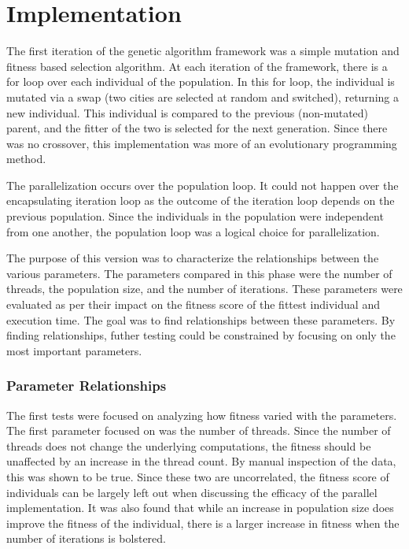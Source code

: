 \documentclass[10pt,letterpaper]{article}
\begin{document}
\section{Implementation} \label{sec:implementation}
The first iteration of the genetic algorithm framework was a simple mutation and fitness based selection algorithm. At each iteration of the framework, there is a for loop over each individual of the population. In this for loop, the individual is mutated via a swap (two cities are selected at random and switched), returning a new individual. This individual is compared to the previous (non-mutated) parent, and the fitter of the two is selected for the next generation. Since there was no crossover, this implementation was more of an evolutionary programming method. 

The parallelization occurs over the population loop. It could not happen over the encapsulating iteration loop as the outcome of the iteration loop depends on the previous population. Since the individuals in the population were independent from one another, the population loop was a logical choice for parallelization. 

The purpose of this version was to characterize the relationships between the various parameters. The parameters compared in this phase were the number of threads, the population size, and the number of iterations. These parameters were evaluated as per their impact on the fitness score of the fittest individual and execution time. The goal was to find relationships between these parameters. By finding relationships, futher testing could be constrained by focusing on only the most important parameters. 


\subsubsection{Parameter Relationships}
The first tests were focused on analyzing how fitness varied with the parameters. The first parameter focused on was the number of threads. Since the number of threads does not change the underlying computations, the fitness should be unaffected by an increase in the thread count. By manual inspection of the data, this was shown to be true. Since these two are uncorrelated, the fitness score of individuals can be largely left out when discussing the efficacy of the parallel implementation. It was also found that while an increase in population size does improve the fitness of the individual, there is a larger increase in fitness when the number of iterations is bolstered.
\end{document}
